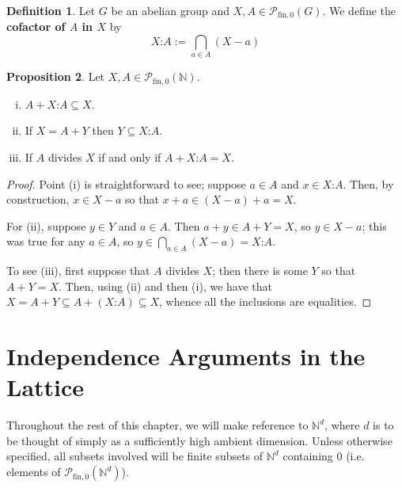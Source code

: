 \documentclass{report}
\newcommand{\NN}{\mathbb{N}}
\renewcommand{\P}{\mathcal{P}}
\newcommand{\fin}{\textrm{fin}}
\newcommand{\fon}{{\textrm{fin}, 0}}
\renewcommand{\:}{\text{:}}
\newcommand{\PN}{{\P_{\fin,0}(\NN)}}
\theoremstyle{definition}
\newtheorem{defn}{Definition}[section]
\newtheorem{prop}[defn]{Proposition}
\begin{document}
\begin{defn} \label{def:cofactor}
	Let $G$ be an abelian group and $X,A\in \P_{\fin,0}(G)$.
	We define the \textbf{cofactor of $A$ in $X$} by
	\[ X\:A := \bigcap_{a\in A} (X-a) \]
\end{defn}

\begin{prop} \label{prop:cofactors}
	Let $X,A \in \PN$. 
	\begin{enumerate}[(i)]
		\item $A + X\:A \subseteq X$.
		\item If $X = A + Y$ then $Y \subseteq X\:A$.
		\item If $A$ divides $X$ if and only if $A + X\:A = X$.
	\end{enumerate}
\end{prop}

\begin{proof}
	Point (i) is straightforward to see; suppose $a\in A$ and $x\in X\:A$.
	Then, by construction, $x\in X-a$ so that $x+a \in (X-a) +a = X$.
	
	For (ii), suppose $y\in Y$ and $a\in A$.
	Then $a+y \in A + Y = X$, so $y \in X-a$; this was true for any $a\in A$, so $y\in \bigcap_{a\in A} (X-a) = X\:A$.
	
	To see (iii), first suppose that $A$ divides $X$; then there is some $Y$ so that $A + Y = X$.
	Then, using (ii) and then (i), we have that $X = A+Y \subseteq A+ (X\:A) \subseteq X$, whence all the inclusions are equalities.
\end{proof}

\section{Independence Arguments in the Lattice}

Throughout the rest of this chapter, we will make reference to $\NN^d$, where $d$ is to be thought of simply as a sufficiently high ambient dimension.
Unless otherwise specified, all subsets involved will be finite subsets of $\NN^d$ containing $0$ (i.e. elements of $\P_\fon(\NN^d)$).
\end{document}
